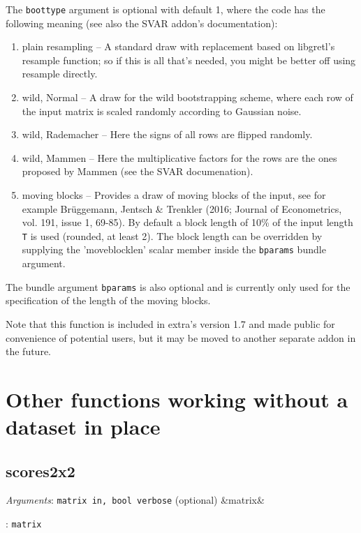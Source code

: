 \documentclass[11pt,english]{article}
\newcommand{\ArgRet}[2]{%
  {\it Arguments}: {#1}%
  \ifx&#2&%
  \else
  \par\smallskip\noindent {\it Return type}: \texttt{#2}
  \fi%
  \par\medskip\par%
  }
\begin{document}
The \texttt{boottype} argument is optional with default 1, where the code has
the following meaning (see also the SVAR addon's documentation):
\begin{enumerate}
  \item plain resampling -- A standard draw with replacement based on
    libgretl's resample function; so if this is all that's needed, you might
    be better off using resample directly. 

  \item wild, Normal -- A draw for the wild bootstrapping scheme, where each
    row of the input matrix is scaled randomly according to Gaussian noise.
  \item wild, Rademacher -- Here the signs of all rows are flipped randomly. 
  \item wild, Mammen -- Here the multiplicative factors for the rows are the
    ones proposed by Mammen (see the SVAR documenation).
  \item moving blocks -- Provides a draw of moving blocks of the input, see 
    for example Brüggemann, Jentsch \& Trenkler (2016; Journal of Econometrics,
    vol. 191, issue 1, 69-85). By default a block length of 10\% of the input 
    length \texttt{T} is used (rounded, at least 2). The block length can be
    overridden by supplying the 'moveblocklen' scalar member inside the
    \texttt{bparams} bundle argument. 

\end{enumerate}

The bundle argument \texttt{bparams} is also optional and is currently only
used for the specification of the length of the moving blocks. 

Note that this function is included in extra's version 1.7 and made public for
convenience of potential users, but it may be moved to another separate addon
in the future. 


\section{Other functions working without a dataset in place}

\subsection{scores2x2}

\ArgRet{\texttt{matrix in, bool verbose} (optional)}{matrix}
\end{document}
